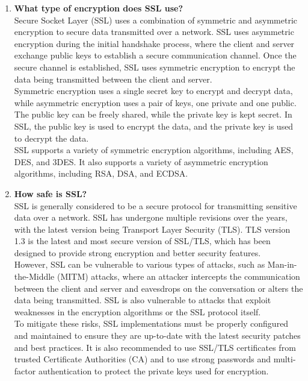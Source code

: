 \documentclass[openany]{book}
\begin{document}
\begin{enumerate}
    \item \textbf{What type of encryption does SSL use?}\\

          Secure Socket Layer (SSL) uses a combination of symmetric and asymmetric encryption to secure data transmitted over a network. SSL uses asymmetric encryption during the initial handshake process, where the client and server exchange public keys to establish a secure communication channel. Once the secure channel is established, SSL uses symmetric encryption to encrypt the data being transmitted between the client and server.\\

          Symmetric encryption uses a single secret key to encrypt and decrypt data, while asymmetric encryption uses a pair of keys, one private and one public. The public key can be freely shared, while the private key is kept secret. In SSL, the public key is used to encrypt the data, and the private key is used to decrypt the data.\\

          SSL supports a variety of symmetric encryption algorithms, including AES, DES, and 3DES. It also supports a variety of asymmetric encryption algorithms, including RSA, DSA, and ECDSA.

    \item \textbf{How safe is SSL?}\\

          SSL is generally considered to be a secure protocol for transmitting sensitive data over a network. SSL has undergone multiple revisions over the years, with the latest version being Transport Layer Security (TLS). TLS version 1.3 is the latest and most secure version of SSL/TLS, which has been designed to provide strong encryption and better security features.\\

          However, SSL can be vulnerable to various types of attacks, such as Man-in-the-Middle (MITM) attacks, where an attacker intercepts the communication between the client and server and eavesdrops on the conversation or alters the data being transmitted. SSL is also vulnerable to attacks that exploit weaknesses in the encryption algorithms or the SSL protocol itself.\\

          To mitigate these risks, SSL implementations must be properly configured and maintained to ensure they are up-to-date with the latest security patches and best practices. It is also recommended to use SSL/TLS certificates from trusted Certificate Authorities (CA) and to use strong passwords and multi-factor authentication to protect the private keys used for encryption.


\end{enumerate}
\end{document}
